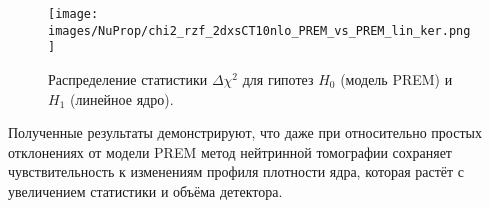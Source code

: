 \begin{figure}[!h]
    \centering
    \texttt{[image: images/NuProp/chi2\_rzf\_2dxsCT10nlo\_PREM\_vs\_PREM\_lin\_ker.png]}
    \caption{Распределение статистики $\Delta\chi^2$ для гипотез $H_0$ (модель PREM) и $H_1$ (линейное ядро).}
    \label{NuTom3}
\end{figure}

Полученные результаты демонстрируют, что даже при относительно простых отклонениях от модели PREM метод нейтринной томографии сохраняет чувствительность к изменениям профиля плотности ядра, которая растёт с увеличением статистики и объёма детектора.
